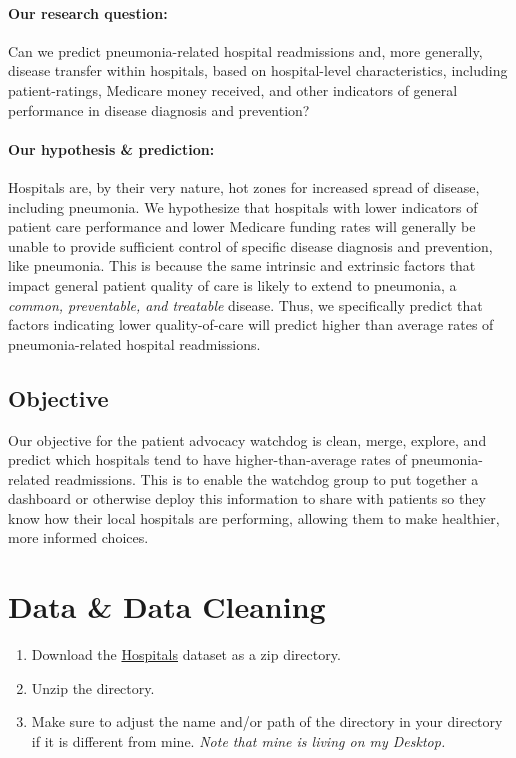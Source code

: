 \documentclass[
]{article}
\providecommand{\tightlist}{%
  \setlength{\itemsep}{0pt}\setlength{\parskip}{0pt}}
\begin{document}
\paragraph{Our research question:}\label{our-research-question}

Can we predict pneumonia-related hospital readmissions and, more
generally, disease transfer within hospitals, based on hospital-level
characteristics, including patient-ratings, Medicare money received, and
other indicators of general performance in disease diagnosis and
prevention?

\paragraph{Our hypothesis \&
prediction:}\label{our-hypothesis-prediction}

Hospitals are, by their very nature, hot zones for increased spread of
disease, including pneumonia. We hypothesize that hospitals with lower
indicators of patient care performance and lower Medicare funding rates
will generally be unable to provide sufficient control of specific
disease diagnosis and prevention, like pneumonia. This is because the
same intrinsic and extrinsic factors that impact general patient quality
of care is likely to extend to pneumonia, a \emph{common, preventable,
and treatable} disease. Thus, we specifically predict that factors
indicating lower quality-of-care will predict higher than average rates
of pneumonia-related hospital readmissions.

\subsection{Objective}\label{objective}

Our objective for the patient advocacy watchdog is clean, merge,
explore, and predict which hospitals tend to have higher-than-average
rates of pneumonia-related readmissions. This is to enable the watchdog
group to put together a dashboard or otherwise deploy this information
to share with patients so they know how their local hospitals are
performing, allowing them to make healthier, more informed choices.

\section{Data \& Data Cleaning}\label{data-data-cleaning}

\begin{enumerate}
\def\labelenumi{\arabic{enumi}.}
\tightlist
\item
  Download the
  \href{https://data.cms.gov/provider-data/topics/hospitals}{Hospitals}
  dataset as a zip directory.
\item
  Unzip the directory.
\item
  Make sure to adjust the name and/or path of the directory in your
  directory if it is different from mine. \emph{Note that mine is living
  on my Desktop.}
\end{enumerate}
\end{document}
